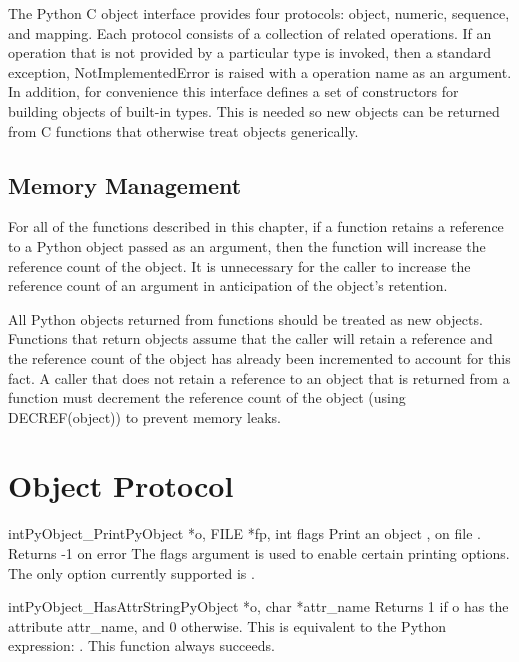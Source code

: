   The Python C object interface provides four protocols: object,
  numeric, sequence, and mapping.  Each protocol consists of a
  collection of related operations.  If an operation that is not
  provided by a particular type is invoked, then a standard exception,
  NotImplementedError is raised with a operation name as an argument.
  In addition, for convenience this interface defines a set of
  constructors for building objects of built-in types.  This is needed
  so new objects can be returned from C functions that otherwise treat
  objects generically.

\subsection{Memory Management}

  For all of the functions described in this chapter, if a function
  retains a reference to a Python object passed as an argument, then the
  function will increase the reference count of the object.  It is
  unnecessary for the caller to increase the reference count of an
  argument in anticipation of the object's retention.

  All Python objects returned from functions should be treated as new
  objects.  Functions that return objects assume that the caller will
  retain a reference and the reference count of the object has already
  been incremented to account for this fact.  A caller that does not
  retain a reference to an object that is returned from a function
  must decrement the reference count of the object (using
  DECREF(object)) to prevent memory leaks.


\section{Object Protocol}

     \begin{cfuncdesc}{int}{PyObject_Print}{PyObject *o, FILE *fp, int flags}
         Print an object , on file .  Returns -1 on error
	 The flags argument is used to enable certain printing
	 options. The only option currently supported is . 
     \end{cfuncdesc}

     \begin{cfuncdesc}{int}{PyObject_HasAttrString}{PyObject *o, char *attr_name}
         Returns 1 if o has the attribute attr_name, and 0 otherwise.
	 This is equivalent to the Python expression:
	 .
	 This function always succeeds.
     \end{cfuncdesc}

